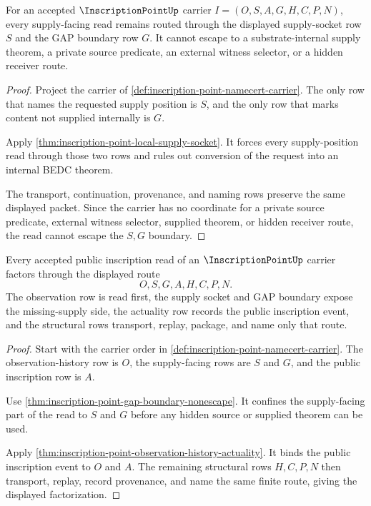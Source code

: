 \begin{theorem}
\label{thm:inscription-point-gap-boundary-nonescape}
For an accepted $\InscriptionPointUp$ carrier $I=(O,S,A,G,H,C,P,N)$, every supply-facing read remains routed through the displayed supply-socket row $S$ and the GAP boundary row $G$. It cannot escape to a substrate-internal supply theorem, a private source predicate, an external witness selector, or a hidden receiver route.
\end{theorem}
\begin{proof}
Project the carrier of \autoref{def:inscription-point-namecert-carrier}. The only row that names the requested supply position is $S$, and the only row that marks content not supplied internally is $G$.

Apply \autoref{thm:inscription-point-local-supply-socket}. It forces every supply-position read through those two rows and rules out conversion of the request into an internal BEDC theorem.

The transport, continuation, provenance, and naming rows preserve the same displayed packet. Since the carrier has no coordinate for a private source predicate, external witness selector, supplied theorem, or hidden receiver route, the read cannot escape the $S,G$ boundary.
\end{proof}

\begin{theorem}
\label{thm:inscription-point-supply-actuality-factorization}
Every accepted public inscription read of an $\InscriptionPointUp$ carrier factors through the displayed route
$$
O,S,G,A,H,C,P,N .
$$
The observation row is read first, the supply socket and GAP boundary expose the missing-supply side, the actuality row records the public inscription event, and the structural rows transport, replay, package, and name only that route.
\end{theorem}
\begin{proof}
Start with the carrier order in \autoref{def:inscription-point-namecert-carrier}. The observation-history row is $O$, the supply-facing rows are $S$ and $G$, and the public inscription row is $A$.

Use \autoref{thm:inscription-point-gap-boundary-nonescape}. It confines the supply-facing part of the read to $S$ and $G$ before any hidden source or supplied theorem can be used.

Apply \autoref{thm:inscription-point-observation-history-actuality}. It binds the public inscription event to $O$ and $A$. The remaining structural rows $H,C,P,N$ then transport, replay, record provenance, and name the same finite route, giving the displayed factorization.
\end{proof}

